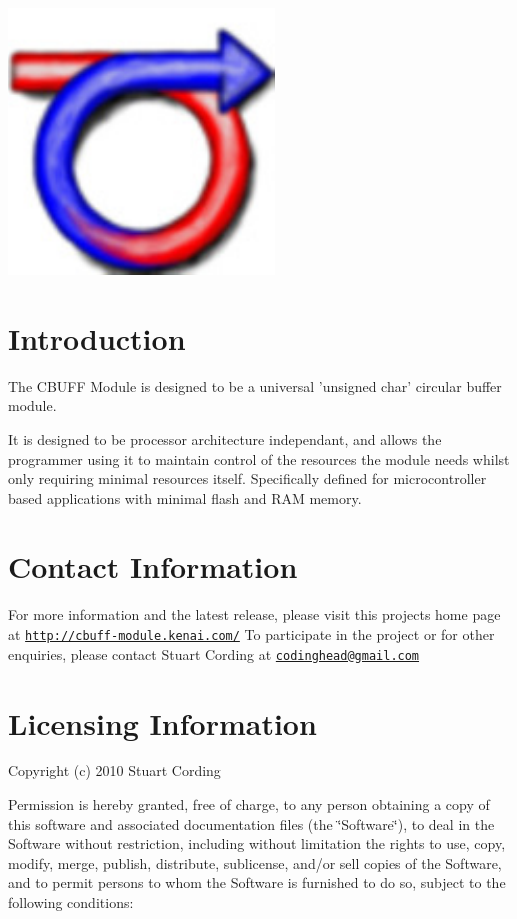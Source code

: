  
\begin{DoxyImageNoCaption}
  \mbox{\includegraphics{cbuff-module_final_small}}
\end{DoxyImageNoCaption}
 \hypertarget{main_intro}{}\section{Introduction}\label{main_intro}
The CBUFF Module is designed to be a universal 'unsigned char' circular buffer module.

It is designed to be processor architecture independant, and allows the programmer using it to maintain control of the resources the module needs whilst only requiring minimal resources itself. Specifically defined for microcontroller based applications with minimal flash and RAM memory.\hypertarget{main_contactInfo}{}\section{Contact Information}\label{main_contactInfo}
For more information and the latest release, please visit this projects home page at \href{http://cbuff-module.kenai.com/}{\tt http://cbuff-\/module.kenai.com/} To participate in the project or for other enquiries, please contact Stuart Cording at \href{mailto:codinghead@gmail.com}{\tt codinghead@gmail.com}\hypertarget{main_license}{}\section{Licensing Information}\label{main_license}
Copyright (c) 2010 Stuart Cording

Permission is hereby granted, free of charge, to any person obtaining a copy of this software and associated documentation files (the \char`\"{}Software\char`\"{}), to deal in the Software without restriction, including without limitation the rights to use, copy, modify, merge, publish, distribute, sublicense, and/or sell copies of the Software, and to permit persons to whom the Software is furnished to do so, subject to the following conditions:

